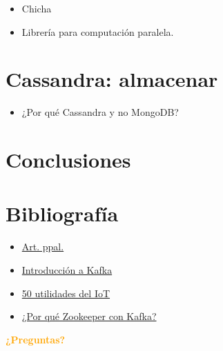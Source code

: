 \documentclass[dvipsnames]{beamer}
\begin{document}
	\begin{frame}
		\begin{itemize}
                \item Chicha
                \item Librería para computación paralela.
		\end{itemize}
	\end{frame}

        \section{Cassandra: almacenar}

        \begin{frame}
          \begin{itemize}
          \item ¿Por qué Cassandra y no MongoDB?
          \end{itemize}
        \end{frame}
        
        \section{Conclusiones}
        	
	\section{Bibliografía}
	
	\begin{frame}
		\begin{itemize}
		\item \href{https://www.infoq.com/articles/traffic-data-monitoring-iot-kafka-and-spark-streaming}{Art. ppal.}
                \item \href{http://kafka.apache.org/intro}{Introducción a Kafka}
                \item \href{http://www.libelium.com/resources/top_50_iot_sensor_applications_ranking/}{50 utilidades del IoT}
                \item \href{https://www.quora.com/What-is-the-actual-role-of-ZooKeeper-in-Kafka}{¿Por qué Zookeeper con Kafka?}
		\end{itemize}
	\end{frame}
	
	\begin{frame}[plain]
		\begin{center}
			\textcolor{orange}{\textbf{¿Preguntas?}}
		\end{center}
	\end{frame}
	
	
\end{document}

